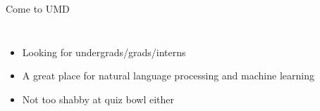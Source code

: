 \documentclass[compress]{beamer}
\begin{document}
\begin{frame}{Come to UMD}

\begin{columns}
		\begin{itemize}
                \item Looking for undergrads/grads/interns
                \item A great place for natural language
                  processing and machine learning
                \item Not too shabby at quiz bowl either
		\end{itemize}
\end{columns}

\end{frame}
\end{document}
